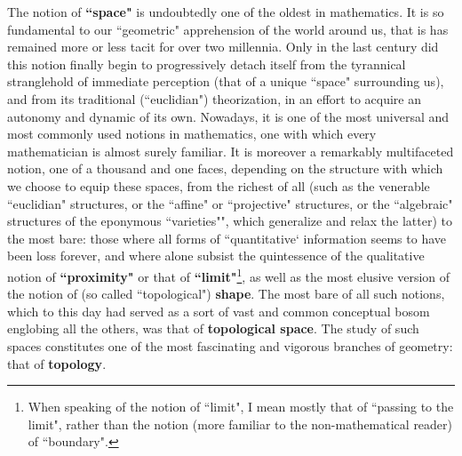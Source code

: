 The notion of \textbf{``space"} is undoubtedly one of the oldest in mathematics. It is so fundamental to our ``geometric" apprehension of the world around us, that is has remained more or less tacit for over two millennia. Only in the last century did this notion finally begin to progressively detach itself from the tyrannical stranglehold of immediate perception (that of a unique ``space" surrounding us), and from its traditional (``euclidian") theorization, in an effort to acquire an autonomy and dynamic of its own. Nowadays, it is one of the most universal and most commonly used notions in mathematics, one with which every mathematician is almost surely familiar. It is moreover a remarkably multifaceted notion, one of a thousand and one faces, depending on the structure with which we choose to equip these spaces, from the richest of all (such as the venerable ``euclidian" structures, or the ``affine" or ``projective" structures, or the ``algebraic" structures of the eponymous ``varieties"", which generalize and relax the latter) to the most bare: those where all forms of ``quantitative` information seems to have been loss forever, and where alone subsist the quintessence of the qualitative notion of \textbf{``proximity"} or that of \textbf{``limit"}\footnote{When speaking of the notion of ``limit", I mean mostly that of ``passing to the limit", rather than the notion (more familiar to the non-mathematical reader) of ``boundary".}, as well as the most elusive version of the notion of (so called ``topological") \textbf{shape}. The most bare of all such notions, which to this day had served as a sort of vast and common conceptual bosom englobing all the others, was that of \textbf{topological space}. The study of such spaces constitutes one of the most fascinating and vigorous branches of geometry: that of \textbf{topology}.

